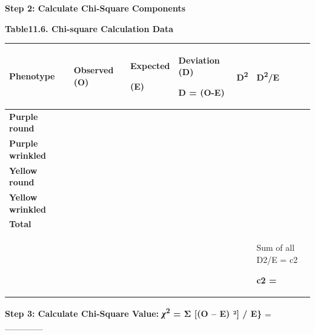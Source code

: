 \documentclass[
  letterpaper,
  DIV=11,
  numbers=noendperiod]{scrreprt}
\newcounter{none} %
\begin{document}
\textbf{Step 2: Calculate Chi-Square Components}

\textbf{Table11.6. Chi-square Calculation Data}

{\def\LTcaptype{none} %
\begin{longtable}[]{@{}
  >{\raggedright\arraybackslash}p{}
  >{\raggedright\arraybackslash}p{}
  >{\raggedright\arraybackslash}p{}
  >{\raggedright\arraybackslash}p{}
  >{\raggedright\arraybackslash}p{}
  >{\raggedright\arraybackslash}p{}@{}}
\toprule\noalign{}
\begin{minipage}[b]{\linewidth}\raggedright
\textbf{Phenotype}
\end{minipage} & \begin{minipage}[b]{\linewidth}\raggedright
\textbf{Observed (O)}
\end{minipage} & \begin{minipage}[b]{\linewidth}\raggedright
\textbf{Expected}

\textbf{(E)}
\end{minipage} & \begin{minipage}[b]{\linewidth}\raggedright
\textbf{Deviation (D)}

\textbf{D = (O-E)}
\end{minipage} & \begin{minipage}[b]{\linewidth}\raggedright
\textbf{D\textsuperscript{2}}
\end{minipage} & \begin{minipage}[b]{\linewidth}\raggedright
\textbf{D\textsuperscript{2}/E}
\end{minipage} \\
\midrule\noalign{}
\endhead
\bottomrule\noalign{}
\endlastfoot
\textbf{Purple round} & & & & & \\
\textbf{Purple wrinkled} & & & & & \\
\textbf{Yellow round} & & & & & \\
\textbf{Yellow wrinkled} & & & & & \\
\textbf{Total} & & & & & \\
& & & & & Sum of all D2/E = c2

\textbf{c2 =} \\
\end{longtable}
}

\textbf{Step 3: Calculate Chi-Square Value: \emph{χ}\textsuperscript{2}
= Σ {[}(O -- E) ²{]} / E\}} = \_\_\_\_\_\_
\end{document}

